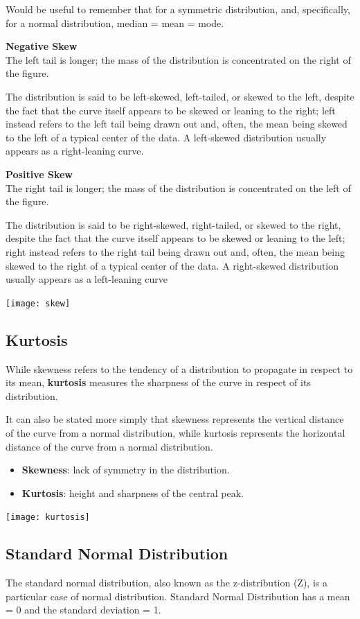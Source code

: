 \documentclass{article}
\begin{document}
Would be useful to remember that for a symmetric distribution, and, specifically, for a normal distribution, median = mean = mode.

\textbf{Negative Skew} \\
The left tail is longer; the mass of the distribution is concentrated on the right of the figure. 

The distribution is said to be left-skewed, left-tailed, or skewed to the left, despite the fact that the curve itself appears to be skewed or leaning to the right; left instead refers to the left tail being drawn out and, often, the mean being skewed to the left of a typical center of the data. A left-skewed distribution usually appears as a right-leaning curve.

\textbf{Positive Skew} \\
The right tail is longer; the mass of the distribution is concentrated on the left of the figure. 

The distribution is said to be right-skewed, right-tailed, or skewed to the right, despite the fact that the curve itself appears to be skewed or leaning to the left; right instead refers to the right tail being drawn out and, often, the mean being skewed to the right of a typical center of the data. A right-skewed distribution usually appears as a left-leaning curve

\texttt{[image: skew]}

\subsection{Kurtosis}
While skewness refers to the tendency of a distribution to propagate in respect to its mean, \textbf{kurtosis} measures the sharpness of the curve in respect of its distribution. 

It can also be stated more simply that skewness represents the vertical distance of the curve from a normal distribution, while kurtosis represents the horizontal distance of the curve from a normal distribution.    

\begin{itemize}
    \item \textbf{Skewness}: lack of symmetry in the distribution.
    \item \textbf{Kurtosis}: height and sharpness of the central peak.
\end{itemize}

\texttt{[image: kurtosis]}

\subsection{Standard Normal Distribution}
The standard normal distribution, also known as the z-distribution (Z), is a particular case of normal distribution. Standard Normal Distribution has a mean = 0 and the standard deviation = 1.
\end{document}

